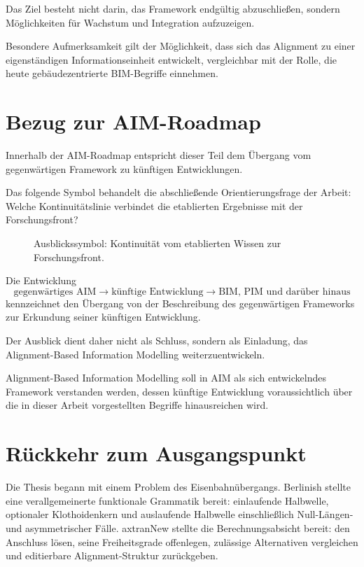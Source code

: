Das Ziel besteht nicht darin, das Framework endgültig abzuschließen,
sondern Möglichkeiten für Wachstum und Integration aufzuzeigen.

Besondere Aufmerksamkeit gilt der Möglichkeit, dass sich das Alignment
zu einer eigenständigen Informationseinheit entwickelt, vergleichbar mit
der Rolle, die heute gebäudezentrierte BIM-Begriffe einnehmen.

\section*{Bezug zur AIM-Roadmap}

Innerhalb der AIM-Roadmap entspricht dieser Teil dem Übergang vom
gegenwärtigen Framework zu künftigen Entwicklungen.

Das folgende Symbol behandelt die abschließende Orientierungsfrage der
Arbeit: Welche Kontinuitätslinie verbindet die etablierten Ergebnisse mit
der Forschungsfront?

\begin{figure}[ht]
\centering

\caption{Ausblickssymbol: Kontinuität vom etablierten Wissen zur Forschungsfront.}
\label{fig:icon-outlook-established-frontier}
\end{figure}

Die Entwicklung
\[
\text{gegenwärtiges AIM}
\rightarrow
\text{künftige Entwicklung}
\rightarrow
\text{BIM, PIM und darüber hinaus}
\]
kennzeichnet den Übergang von der Beschreibung des gegenwärtigen
Frameworks zur Erkundung seiner künftigen Entwicklung.

Der Ausblick dient daher nicht als Schluss, sondern als Einladung, das
Alignment-Based Information Modelling weiterzuentwickeln.

\begin{principle}
\label{princ:open-framework-principle}
Alignment-Based Information Modelling soll in AIM als sich entwickelndes
Framework verstanden werden, dessen künftige Entwicklung voraussichtlich
über die in dieser Arbeit vorgestellten Begriffe hinausreichen wird.
\end{principle}

\section*{Rückkehr zum Ausgangspunkt}

Die Thesis begann mit einem Problem des Eisenbahnübergangs. Berlinish stellte
eine verallgemeinerte funktionale Grammatik bereit: einlaufende Halbwelle,
optionaler Klothoidenkern und auslaufende Halbwelle einschließlich
Null-Längen- und asymmetrischer Fälle. axtranNew stellte die
Berechnungsabsicht bereit: den Anschluss lösen, seine Freiheitsgrade offenlegen,
zulässige Alternativen vergleichen und editierbare Alignment-Struktur
zurückgeben.

